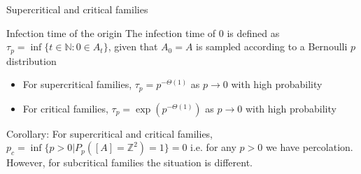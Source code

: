\begin{frame}{Supercritical and critical families}
\begin{block}{Infection time of the origin}
The infection time of 0 is defined as $\tau_p=\inf\{t\in\mathbb{N}: 0 \in A_t\}$, given that $A_0=A$ is sampled according to a Bernoulli $p$ distribution
\end{block}

\begin{itemize}
    \item For supercritical families, $\tau_p=p^{-\Theta(1)}$ as $p\rightarrow 0$ with high probability
    \item For critical families, $\tau_p=\exp(p^{-\Theta(1)})$ as 
    $p\rightarrow 0$ with high probability
\end{itemize}

Corollary: For supercritical and critical families, $p_c=\inf\{p>0|P_p([A]=\mathbb{Z}^2)=1\}=0$ i.e. for any $p>0$ we have percolation.
\newline
However, for subcritical families the situation is different.

    
\end{frame}